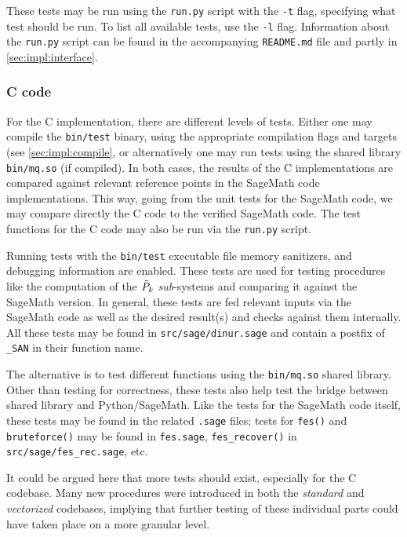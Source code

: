 These tests may be run using the \texttt{run.py} script with the \texttt{-t} flag, specifying what test should be run. To list all available tests, use the \texttt{-l} flag. Information about the \texttt{run.py} script can be found in the accompanying \texttt{README.md} file and partly in \cref{sec:impl:interface}.

\subsubsection{C code}

For the C implementation, there are different levels of tests. Either one may compile the \texttt{bin/test} binary, using the appropriate compilation flags and targets (see \cref{sec:impl:compile}, or alternatively one may run tests using the shared library \texttt{bin/mq.so} (if compiled). In both cases, the results of the C implementations are compared against relevant reference points in the SageMath code implementations. This way, going from the unit tests for the SageMath code, we may compare directly the C code to the verified SageMath code. The test functions for the C code may also be run via the \texttt{run.py} script.

Running tests with the \texttt{bin/test} executable file memory sanitizers, and debugging information are enabled. These tests are used for testing procedures like the computation of the $\Tilde{P}_k$ \textit{sub}-systems and comparing it against the SageMath version. In general, these tests are fed relevant inputs via the SageMath code as well as the desired result(s) and checks against them internally. All these tests may be found in \texttt{src/sage/dinur.sage} and contain a postfix of \texttt{\_SAN} in their function name.

The alternative is to test different functions using the \texttt{bin/mq.so} shared library. Other than testing for correctness, these tests also help test the bridge between shared library and Python/SageMath. Like the tests for the SageMath code itself, these tests may be found in the related \texttt{.sage} files; tests for \texttt{fes()} and \texttt{bruteforce()} may be found in \texttt{fes.sage}, \texttt{fes\_recover()} in \texttt{src/sage/fes\_rec.sage}, etc.

It could be argued here that more tests should exist, especially for the C codebase. Many new procedures were introduced in both the \textit{standard} and \textit{vectorized} codebases, implying that further testing of these individual parts could have taken place on a more granular level.

